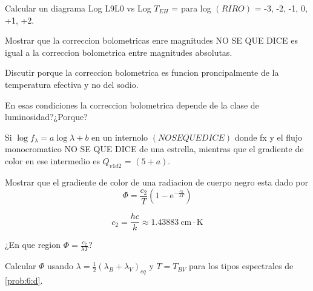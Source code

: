 \documentclass[12pt,a4paper]{practice}
\begin{document}
    \begin{problem}\label{prob:9}
        Calcular un diagrama Log L9L0 vs Log $T_{EH}$ = para log $\left(RIRO\right)$ = -3, -2, -1, 0, +1, +2.

            \begin{ppart}\label{prob:9:a}
                Mostrar que la correccion bolometricas enre magnitudes NO SE QUE DICE  es igual a la correccion bolometrica entre magnitudes absolutas.
            \end{ppart}
    \end{problem}

    \begin{problem}\label{prob:10}
        Discutir porque la correccion bolometrica es funcion proncipalmente de la temperatura efectiva y no del sodio.

        En esas condiciones la correccion bolometrica depende de la clase de luminosidad?¿Porque?
    \end{problem}

    \begin{problem}\label{prob:11}
        Si $\log f_{\lambda} = a\log\lambda + b$ en un internolo $\left(NO SE QUE DICE\right)$ donde fx y el flujo monocromatico NO SE QUE DICE de una estrella, mientras que el gradiente de color en ese intermedio es $Q_{v1d2}$ = $\left(5+a\right)$.
    \end{problem}

    \begin{problem}\label{prob:12}
        \begin{ppart}\label{prob:12:a}
            Mostrar que el gradiente de color de una radiacion de cuerpo negro esta dado por
            $$
                \Phi = \frac{c_2}{T}\left(1 - \mathrm{e}^{-\frac{c_2}{\lambda T}}\right)
            $$

            $$
                c_2 = \frac{hc}{k} \approx 1.43883\ \mathrm{cm \cdot K}
            $$
        \end{ppart}

        \begin{ppart}\label{prob:12:b}
            ¿En que region $\Phi = \frac{c_2}{\lambda T}$?
        \end{ppart}

        \begin{ppart}\label{prob:12:c}
            Calcular $\Phi$ usando $\lambda = \frac{1}{2}\left(\lambda_B + \lambda_V\right)_{eq}$ y $T = T_{BV}$ para los tipos espectrales de \ref{prob:6:d}.
        \end{ppart}
    \end{problem}
\end{document}
